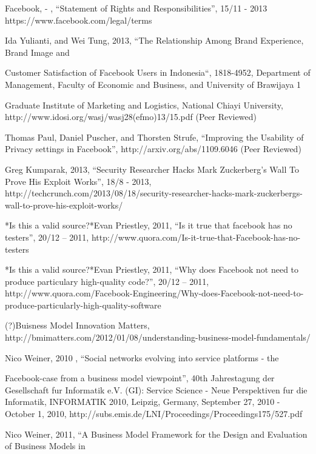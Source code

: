 \documentclass[conference]{IEEEtran}
\begin{document}
\begin{thebibliography}{1}
Facebook, - , “Statement of Rights and Responsibilities”, 15/11 - 2013
https://www.facebook.com/legal/terms

Ida Yulianti, and Wei Tung, 2013, “The Relationship Among Brand Experience,
Brand Image and

Customer Satisfaction of Facebook Users in Indonesia“, 1818-4952, Department of
Management, Faculty of Economic and Business, and University of Brawijaya 1

Graduate Institute of Marketing and Logistics, National Chiayi University,
http://www.idosi.org/wasj/wasj28(efmo)13/15.pdf (Peer Reviewed)

Thomas Paul, Daniel Puscher, and Thorsten Strufe, “Improving the Usability of
Privacy settings in Facebook”, http://arxiv.org/abs/1109.6046 (Peer Reviewed)

Greg Kumparak, 2013, “Security Researcher Hacks Mark Zuckerberg’s Wall To Prove
His Exploit Works”, 18/8 - 2013,
http://techcrunch.com/2013/08/18/security-researcher-hacks-mark-zuckerbergs-wall-to-prove-his-exploit-works/

*Is this a valid source?*Evan Priestley, 2011, “Is it true that facebook has no
testers”, 20/12 – 2011,
http://www.quora.com/Is-it-true-that-Facebook-has-no-testers

*Is this a valid source?*Evan Priestley, 2011, “Why does Facebook not need to
produce particulary high-quality code?”, 20/12 – 2011,
http://www.quora.com/Facebook-Engineering/Why-does-Facebook-not-need-to-produce-particularly-high-quality-software

(?)Buisness Model Innovation Matters,
http://bmimatters.com/2012/01/08/understanding-business-model-fundamentals/

Nico Weiner, 2010 , “Social networks evolving into service platforms - the

Facebook-case from a business model viewpoint”, 40th Jahrestagung der
Gesellschaft fur Informatik e.V. (GI): Service Science - Neue Perspektiven fur
die Informatik, INFORMATIK 2010, Leipzig, Germany, September 27, 2010 - October
1, 2010, http://subs.emis.de/LNI/Proceedings/Proceedings175/527.pdf

Nico Weiner, 2011, “A Business Model Framework for the Design and Evaluation of
Business Models in 


\end{thebibliography}
\end{document}
